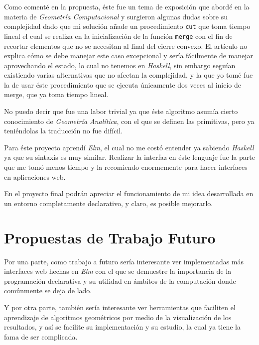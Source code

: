\documentclass[12pt]{article}
\begin{document}
Como comenté en la propuesta, éste fue un tema de exposición que abordé en la materia de \textit{Geometría Computacional} y surgieron algunas dudas sobre su complejidad dado que mi solución añade un procedimiento \texttt{cut} que toma tiempo lineal el cual se realiza en la inicialización de la función \texttt{merge} con el fin de recortar elementos que no se necesitan al final del cierre convexo. El artículo no explica cómo se debe manejar este caso excepcional y sería fácilmente de manejar aprovechando el estado, lo cual no tenemos en \textit{Haskell}, sin embargo seguían existiendo varias alternativas que no afectan la complejidad, y la que yo tomé fue la de usar éste procedimiento que se ejecuta únicamente dos veces al inicio de merge, que ya toma tiempo lineal.

No puedo decir que fue una labor trivial ya que éste algoritmo asumía cierto conocimiento de \textit{Geometría Analítica}, con el que se definen las primitivas, pero ya teniéndolas la traducción no fue difícil.

Para éste proyecto aprendí \textit{Elm}, el cual no me costó entender ya sabiendo \textit{Haskell} ya que su sintaxis es muy similar. Realizar la interfaz en éste lenguaje fue la parte que me tomó menos tiempo y la recomiendo enormemente para hacer interfaces en aplicaciones web.

En el proyecto final podrán apreciar el funcionamiento de mi idea desarrollada en un entorno completamente declarativo, y claro, es posible mejorarlo.

\newpage

\section*{Propuestas de Trabajo Futuro}

Por una parte, como trabajo a futuro sería interesante ver implementadas más interfaces web hechas en \textit{Elm} con el que se demuestre la importancia de la programación declarativa y su utilidad en ámbitos de la computación donde comúnmente se deja de lado.

Y por otra parte, también sería interesante ver herramientas que faciliten el aprendizaje de algoritmos geométricos por medio de la visualización de los resultados, y así se facilite su implementación y su estudio, la cual ya tiene la fama de ser complicada.
\end{document}
